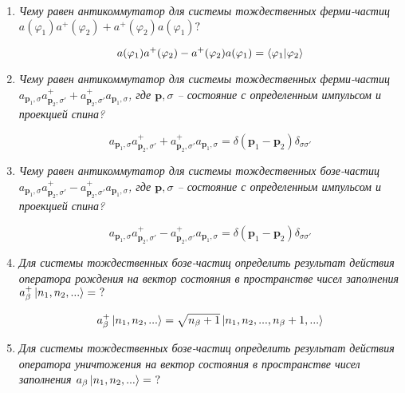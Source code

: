 \documentclass{article}
\begin{document}
\begin{enumerate}
	\item \textit{Чему равен антикоммутатор для системы тождественных ферми-частиц \\$a(\varphi_1)a^+(\varphi_2) + a^+(\varphi_2)a(\varphi_1)?$}
	
	\begin{equation}
		a(\varphi_1)a^+(\varphi_2) - a^+(\varphi_2)a(\varphi_1) = \braket{\varphi_1|\varphi_2}
	\end{equation}
	
	\item \textit{Чему равен антикоммутатор для системы тождественных ферми-частиц \\ $a_{\textbf{p}_1,\sigma} a^+_{\textbf{p}_2,\sigma'} + a^+_{\textbf{p}_2,\sigma'}a_{\textbf{p}_1,\sigma}$, где ${\textbf{p},\sigma}$ – состояние с определенным импульсом и проекцией спина?}
	
	\begin{equation}
		a_{\textbf{p}_1,\sigma} a^+_{\textbf{p}_2,\sigma'} + a^+_{\textbf{p}_2,\sigma'}a_{\textbf{p}_1,\sigma} = \delta(\textbf{p}_1 - \textbf{p}_2)\delta_{\sigma\sigma'}
	\end{equation}
	
	\item \textit{Чему равен антикоммутатор для системы тождественных бозе-частиц \\ $a_{\textbf{p}_1,\sigma} a^+_{\textbf{p}_2,\sigma'} - a^+_{\textbf{p}_2,\sigma'}a_{\textbf{p}_1,\sigma}$, где ${\textbf{p},\sigma}$ – состояние с определенным импульсом и проекцией спина?}
	
	\begin{equation}
		a_{\textbf{p}_1,\sigma} a^+_{\textbf{p}_2,\sigma'} - a^+_{\textbf{p}_2,\sigma'}a_{\textbf{p}_1,\sigma} = \delta(\textbf{p}_1 - \textbf{p}_2)\delta_{\sigma\sigma'}
	\end{equation}
	
	\item \textit{Для системы тождественных бозе-частиц определить результат действия оператора рождения на вектор состояния в пространстве чисел заполнения $a^+_\beta \ket{n_1, n_2, ...} = \ ?$}
	
	\begin{equation}
		a^+_\beta \ket{n_1, n_2, ...} = \sqrt{n_\beta + 1} \ket{n_1, n_2, ..., n_\beta +1,...}
	\end{equation}
	
	\item \textit{Для системы тождественных бозе-частиц определить результат действия оператора уничтожения на вектор состояния в пространстве чисел заполнения $a_\beta \ket{n_1, n_2, ...} = \ ?$}
	

\end{enumerate}
\end{document}

